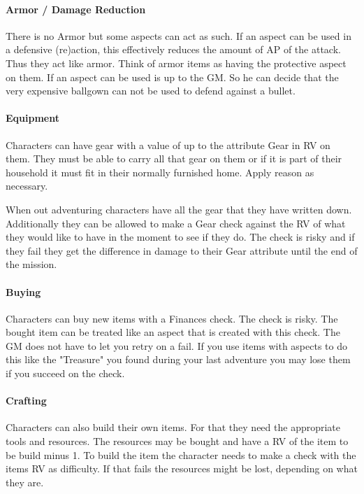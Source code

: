 \documentclass[11pt]{article}
\begin{document}
{\paragraph*{Armor / Damage Reduction}
\label{sec:org0c88bc4}
There is no Armor but some aspects can act as such. If an aspect can be used in a defensive (re)action, this effectively reduces the amount of AP of the attack. Thus they act like armor. Think of armor items as having the protective aspect on them. If an aspect can be used is up to the GM. So he can decide that the very expensive ballgown can not be used to defend against a bullet.

\paragraph*{Equipment}
\label{sec:orgb26f54e}
Characters can have gear with a value of up to the attribute Gear in RV on them. They must be able to carry all that gear on them or if it is part of their household it must fit in their normally furnished home. Apply reason as necessary.

When out adventuring characters have all the gear that they have written down. Additionally they can be allowed to make a Gear check against the RV of what they would like to have in the moment to see if they do. The check is risky and if they fail they get the difference in damage to their Gear attribute until the end of the mission.

\paragraph*{Buying}
\label{sec:org255a2de}
Characters can buy new items with a Finances check. The check is risky. The bought item can be treated like an aspect that is created with this check. The GM does not have to let you retry on a fail. If you use items with aspects to do this like the "Treasure" you found during your last adventure you may lose them if you succeed on the check.

\paragraph*{Crafting}
\label{sec:orgd1cf44b}
Characters can also build their own items. For that they need the appropriate tools and resources. The resources may be bought and have a RV of the item to be build minus 1. To build the item the character needs to make a check with the items RV as difficulty. If that fails the resources might be lost, depending on what they are.

}
\end{document}
